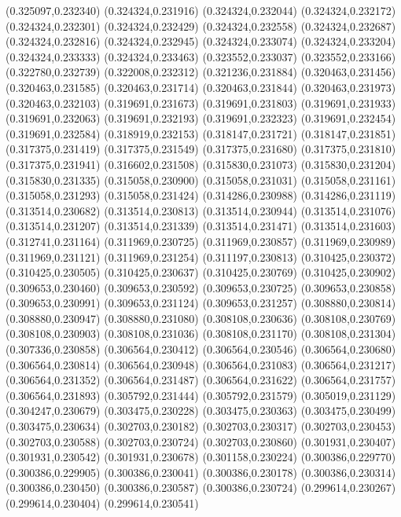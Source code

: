 (0.325097,0.232340)
(0.324324,0.231916)
(0.324324,0.232044)
(0.324324,0.232172)
(0.324324,0.232301)
(0.324324,0.232429)
(0.324324,0.232558)
(0.324324,0.232687)
(0.324324,0.232816)
(0.324324,0.232945)
(0.324324,0.233074)
(0.324324,0.233204)
(0.324324,0.233333)
(0.324324,0.233463)
(0.323552,0.233037)
(0.323552,0.233166)
(0.322780,0.232739)
(0.322008,0.232312)
(0.321236,0.231884)
(0.320463,0.231456)
(0.320463,0.231585)
(0.320463,0.231714)
(0.320463,0.231844)
(0.320463,0.231973)
(0.320463,0.232103)
(0.319691,0.231673)
(0.319691,0.231803)
(0.319691,0.231933)
(0.319691,0.232063)
(0.319691,0.232193)
(0.319691,0.232323)
(0.319691,0.232454)
(0.319691,0.232584)
(0.318919,0.232153)
(0.318147,0.231721)
(0.318147,0.231851)
(0.317375,0.231419)
(0.317375,0.231549)
(0.317375,0.231680)
(0.317375,0.231810)
(0.317375,0.231941)
(0.316602,0.231508)
(0.315830,0.231073)
(0.315830,0.231204)
(0.315830,0.231335)
(0.315058,0.230900)
(0.315058,0.231031)
(0.315058,0.231161)
(0.315058,0.231293)
(0.315058,0.231424)
(0.314286,0.230988)
(0.314286,0.231119)
(0.313514,0.230682)
(0.313514,0.230813)
(0.313514,0.230944)
(0.313514,0.231076)
(0.313514,0.231207)
(0.313514,0.231339)
(0.313514,0.231471)
(0.313514,0.231603)
(0.312741,0.231164)
(0.311969,0.230725)
(0.311969,0.230857)
(0.311969,0.230989)
(0.311969,0.231121)
(0.311969,0.231254)
(0.311197,0.230813)
(0.310425,0.230372)
(0.310425,0.230505)
(0.310425,0.230637)
(0.310425,0.230769)
(0.310425,0.230902)
(0.309653,0.230460)
(0.309653,0.230592)
(0.309653,0.230725)
(0.309653,0.230858)
(0.309653,0.230991)
(0.309653,0.231124)
(0.309653,0.231257)
(0.308880,0.230814)
(0.308880,0.230947)
(0.308880,0.231080)
(0.308108,0.230636)
(0.308108,0.230769)
(0.308108,0.230903)
(0.308108,0.231036)
(0.308108,0.231170)
(0.308108,0.231304)
(0.307336,0.230858)
(0.306564,0.230412)
(0.306564,0.230546)
(0.306564,0.230680)
(0.306564,0.230814)
(0.306564,0.230948)
(0.306564,0.231083)
(0.306564,0.231217)
(0.306564,0.231352)
(0.306564,0.231487)
(0.306564,0.231622)
(0.306564,0.231757)
(0.306564,0.231893)
(0.305792,0.231444)
(0.305792,0.231579)
(0.305019,0.231129)
(0.304247,0.230679)
(0.303475,0.230228)
(0.303475,0.230363)
(0.303475,0.230499)
(0.303475,0.230634)
(0.302703,0.230182)
(0.302703,0.230317)
(0.302703,0.230453)
(0.302703,0.230588)
(0.302703,0.230724)
(0.302703,0.230860)
(0.301931,0.230407)
(0.301931,0.230542)
(0.301931,0.230678)
(0.301158,0.230224)
(0.300386,0.229770)
(0.300386,0.229905)
(0.300386,0.230041)
(0.300386,0.230178)
(0.300386,0.230314)
(0.300386,0.230450)
(0.300386,0.230587)
(0.300386,0.230724)
(0.299614,0.230267)
(0.299614,0.230404)
(0.299614,0.230541)
